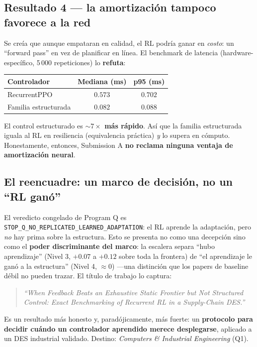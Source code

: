 \documentclass[11pt,a4paper]{article}
\newcommand{\code}[1]{\texttt{#1}}
\begin{document}
\subsection{Resultado 4 — la amortización tampoco favorece a la red}
Se creía que aunque empataran en calidad, el RL podría ganar en \emph{costo}: un ``forward pass'' en
vez de planificar en línea. El benchmark de latencia (hardware-específico, 5\,000 repeticiones) lo
\textbf{refuta}:
\begin{center}
\begin{tabular}{lcc}
\toprule
Controlador & Mediana (ms) & p95 (ms) \\
\midrule
RecurrentPPO & $0.573$ & $0.702$ \\
Familia estructurada & $0.082$ & $0.088$ \\
\bottomrule
\end{tabular}
\end{center}
El control estructurado es \textbf{${\sim}7\times$ más rápido}. Así que la familia estructurada iguala
al RL en resiliencia (equivalencia práctica) \emph{y} lo supera en cómputo. Honestamente, entonces,
Submission A \textbf{no reclama ninguna ventaja de amortización neural}.

\subsection{El reencuadre: un marco de decisión, no un ``RL ganó''}
El veredicto congelado de Program Q es \code{STOP\_Q\_NO\_REPLICATED\_LEARNED\_ADAPTATION}: el RL
aprende la adaptación, pero \emph{no} hay prima sobre la estructura. Esto se presenta no como una
decepción sino como el \textbf{poder discriminante del marco}: la escalera separa ``hubo aprendizaje''
(Nivel 3, $+0.07$ a $+0.12$ sobre toda la frontera) de ``el aprendizaje le ganó a la estructura''
(Nivel 4, ${\approx}0$) —una distinción que los papers de baseline débil no pueden trazar. El título de
trabajo lo captura:
\begin{quote}
\emph{``When Feedback Beats an Exhaustive Static Frontier but Not Structured Control: Exact Benchmarking
of Recurrent RL in a Supply-Chain DES.''}
\end{quote}
Es un resultado más honesto y, paradójicamente, más fuerte: un \textbf{protocolo para decidir cuándo un
controlador aprendido merece desplegarse}, aplicado a un DES industrial validado. Destino: \emph{Computers
\& Industrial Engineering} (Q1).

\end{document}
